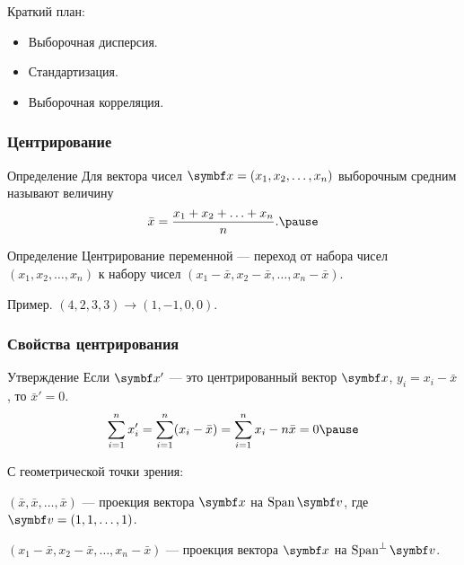 
\begin{frame} %


\end{frame}



\begin{frame}{Краткий план:}
  \begin{itemize}[<+->]
    \item Выборочная дисперсия.
    \item Стандартизация.
    \item Выборочная корреляция.
  \end{itemize}

\end{frame}

\begin{frame}
  \frametitle{Центрирование}


  \begin{block}{Определение}
    Для вектора чисел $\bx = (x_1, x_2, \ldots, x_n)$ \alert{выборочным средним} называют величину
    \[
    \bar x = \frac{x_1 + x_2 + \ldots + x_n}{n}. \pause
    \]
  \end{block}

  \begin{block}{Определение}
    \alert{Центрирование переменной} — переход от набора чисел
    $(x_1, x_2, \ldots, x_n)$ к набору чисел $(x_1 - \bar x, x_2 - \bar x, \ldots, x_n - \bar x)$. \pause
  \end{block}

  Пример. $(4, 2, 3, 3) \to (1, -1, 0, 0)$.

\end{frame}


\begin{frame}
  \frametitle{Свойства центрирования}

  \begin{block}{Утверждение}
Если $\bx'$ — это центрированный вектор $\bx$, $y_i = x_i - \bar x$, то 
$\bar x' = 0$. \pause
\[
\sum_{i=1}^n x'_i = \sum_{i=1}^n (x_i - \bar x) = \sum_{i=1}^n x_i - n\bar x =0  \pause
\]
  \end{block}

  С геометрической точки зрения:
  
  $(\bar x, \bar x, \ldots, \bar x)$ — проекция вектора $\bx$ на $\Span \bv$, где
  $\bv = (1, 1, \ldots, 1)$. \pause


$(x_1 - \bar x, x_2 - \bar x, \ldots, x_n - \bar x)$ — проекция вектора $\bx$ на $\Span^{\perp} \bv$.


\end{frame}



